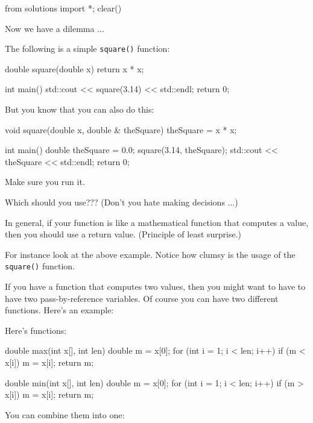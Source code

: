 \begin{python0}
from solutions import *; clear()
\end{python0}

Now we have a dilemma ...

The following is a simple \texttt{square()} function:

\begin{consolethree}[escapeinside=||]
double square(double x)
{
    return x * x;
}

int main()
{
    std::cout << square(3.14) << std::endl;
    return 0;
}
\end{consolethree}

But you know that you can also do this:

\begin{consolethree}[escapeinside=||]
void square(double x, double & theSquare)
{
    theSquare = x * x;
}

int main()
{
    double theSquare = 0.0;
    square(3.14, theSquare);
    std::cout << theSquare << std::endl;
    return 0;
}
\end{consolethree}

Make sure you run it.

Which should you use??? (Don't you hate making decisions ...)

In general, if your function is like a mathematical function that computes a value, then you should use a return value. (Principle of least surprise.)

For instance look at the above example. Notice how clumsy is the usage of the \texttt{square()} function.

If you have a function that computes two values, then you might want to have to have two pass-by-reference variables. Of course you can have two different functions. Here's an example:

Here's functions:

\begin{consolethree}[escapeinside=||]
double max(int x[], int len)
{
    double m = x[0];
    for (int i = 1; i < len; i++)
    {
        if (m < x[i]) m = x[i];
    }
    return m;
}

double min(int x[], int len)
{
    double m = x[0];
    for (int i = 1; i < len; i++)
    {
        if (m > x[i]) m = x[i];
    }
    return m;
}
\end{consolethree}

You can combine them into one:

